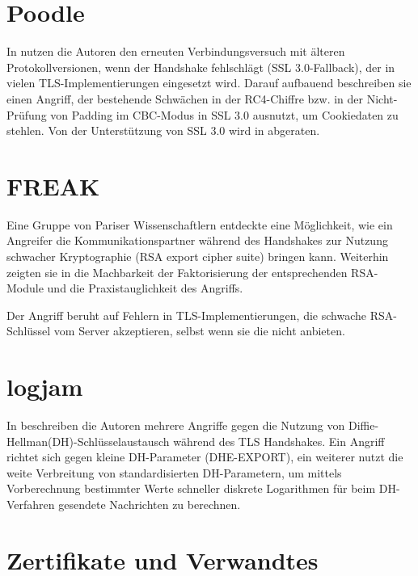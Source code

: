 \section{Poodle}

In \cite{moeller14} nutzen die Autoren den erneuten Verbindungsversuch mit älteren Protokollversionen, wenn der Handshake fehlschlägt (SSL 3.0-Fallback), der in vielen TLS-Implementierungen eingesetzt wird. Darauf aufbauend beschreiben sie einen Angriff, der bestehende Schwächen in der RC4-Chiffre  bzw. in der Nicht-Prüfung von Padding im CBC-Modus in SSL 3.0 ausnutzt, um Cookiedaten zu stehlen.
Von der Unterstützung von SSL 3.0 wird in \cite{deprecate_ssl30} abgeraten.

\section{FREAK}

\label{sec_attack_freak}

Eine Gruppe von Pariser Wissenschaftlern entdeckte eine Möglichkeit, wie ein Angreifer die Kommunikationspartner während des Handshakes zur Nutzung schwacher Kryptographie (RSA export cipher suite) bringen kann. Weiterhin zeigten sie in \cite{freak15} die Machbarkeit der Faktorisierung der entsprechenden RSA-Module und die Praxistauglichkeit des Angriffs.

Der Angriff beruht auf Fehlern in TLS-Implementierungen, die schwache RSA-Schlüssel vom Server akzeptieren, selbst wenn sie die \ciphersuites nicht anbieten.

\section{logjam}

In \cite{logjam15} beschreiben die Autoren mehrere Angriffe gegen die Nutzung von Diffie-Hellman(DH)-Schlüsselaustausch während des TLS Handshakes. Ein Angriff richtet sich gegen kleine DH-Parameter (DHE-EXPORT), ein weiterer nutzt die weite Verbreitung von standardisierten DH-Parametern, um mittels Vorberechnung bestimmter Werte schneller diskrete Logarithmen für beim DH-Verfahren gesendete Nachrichten zu berechnen.

\section{Zertifikate und Verwandtes}

